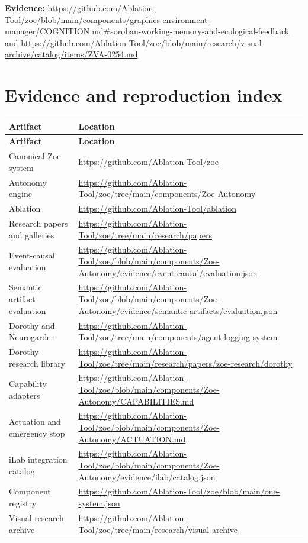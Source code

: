 \documentclass[11pt]{article}
\newcommand{\evidence}[1]{\par\smallskip\small\color{ZoeGray}\textbf{Evidence:} #1\normalsize\par\smallskip}
\begin{document}
\evidence{\url{https://github.com/Ablation-Tool/zoe/blob/main/components/graphics-environment-manager/COGNITION.md\#soroban-working-memory-and-ecological-feedback} and \url{https://github.com/Ablation-Tool/zoe/blob/main/research/visual-archive/catalog/items/ZVA-0254.md}}

\clearpage
\section{Evidence and reproduction index}

\begin{longtable}{p{}p{}}
\toprule
\textbf{Artifact} & \textbf{Location}\\
\midrule
\endfirsthead
\toprule
\textbf{Artifact} & \textbf{Location}\\
\midrule
\endhead
Canonical Zoe system & \url{https://github.com/Ablation-Tool/zoe}\\
Autonomy engine & \url{https://github.com/Ablation-Tool/zoe/tree/main/components/Zoe-Autonomy}\\
Ablation & \url{https://github.com/Ablation-Tool/ablation}\\
Research papers and galleries & \url{https://github.com/Ablation-Tool/zoe/tree/main/research/papers}\\
Event-causal evaluation & \url{https://github.com/Ablation-Tool/zoe/blob/main/components/Zoe-Autonomy/evidence/event-causal/evaluation.json}\\
Semantic artifact evaluation & \url{https://github.com/Ablation-Tool/zoe/blob/main/components/Zoe-Autonomy/evidence/semantic-artifacts/evaluation.json}\\
Dorothy and Neurogarden & \url{https://github.com/Ablation-Tool/zoe/tree/main/components/agent-logging-system}\\
Dorothy research library & \url{https://github.com/Ablation-Tool/zoe/tree/main/research/papers/zoe-research/dorothy}\\
Capability adapters & \url{https://github.com/Ablation-Tool/zoe/blob/main/components/Zoe-Autonomy/CAPABILITIES.md}\\
Actuation and emergency stop & \url{https://github.com/Ablation-Tool/zoe/blob/main/components/Zoe-Autonomy/ACTUATION.md}\\
iLab integration catalog & \url{https://github.com/Ablation-Tool/zoe/blob/main/components/Zoe-Autonomy/evidence/ilab/catalog.json}\\
Component registry & \url{https://github.com/Ablation-Tool/zoe/blob/main/one-system.json}\\
Visual research archive & \url{https://github.com/Ablation-Tool/zoe/tree/main/research/visual-archive}\\
\bottomrule
\end{longtable}
\end{document}
